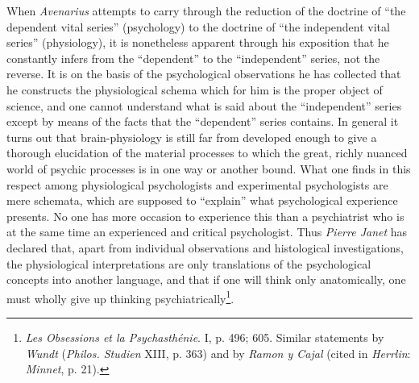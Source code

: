 \documentclass[12pt,a4paper]{book}
\begin{document}
When \emph{Avenarius} attempts to carry through the reduction of the
doctrine of ``the dependent vital series'' (psychology) to the doctrine
of ``the independent vital series'' (physiology), it is nonetheless
apparent through his exposition that he constantly infers from the
``dependent'' to the ``independent'' series, not the reverse. It is on
the basis of the psychological observations he has collected that he
constructs the physiological schema which for him is the proper object
of science, and one cannot understand what is said about the
``independent'' series except by means of the facts that the
``dependent'' series contains. In general it turns out that
brain-physiology is still far from developed enough to give a thorough
elucidation of the material processes to which the great, richly nuanced
world of psychic processes is in one way or another bound. What one
finds in this respect among physiological psychologists and experimental
psychologists are mere schemata, which are supposed to ``explain'' what
psychological experience presents. No one has more occasion to
experience this than a psychiatrist who is at the same time an
experienced and critical psychologist. Thus \emph{Pierre Janet} has
declared that, apart from individual observations and histological
investigations, the physiological interpretations are only translations
of the psychological concepts into another language, and that if one
will think only anatomically, one must wholly give up thinking
psychiatrically\footnote{\emph{Les Obsessions et la Psychasthénie}. I,
p. 496; 605. Similar statements by \emph{Wundt} (\emph{Philos. Studien}
XIII, p. 363) and by \emph{Ramon y Cajal} (cited in \emph{Herrlin}:
\emph{Minnet}, p. 21).}.
\end{document}
